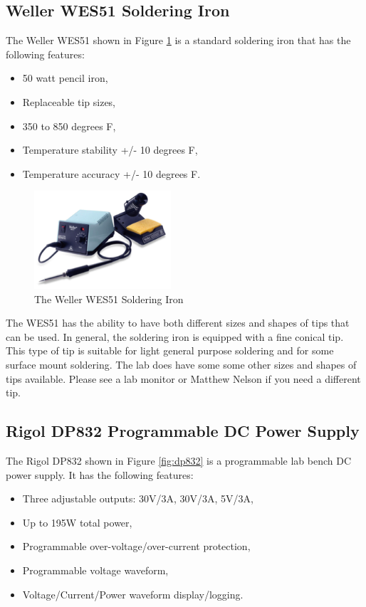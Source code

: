 \subsection{Weller WES51 Soldering Iron}
The Weller WES51 shown in Figure \ref{fig:wes51} is a standard soldering iron that has the following features:

\begin{itemize}
\item 50 watt pencil iron,
\item Replaceable tip sizes,
\item 350 to 850 degrees F,
\item Temperature stability +/- 10 degrees F,
\item Temperature accuracy +/- 10 degrees F.
\end{itemize}

\begin{figure}[ht]
\centering
\includegraphics[width=2in]{images/wes51.png}
\caption{The Weller WES51 Soldering Iron}
\label{fig:wes51}
\end{figure}

The WES51 has the ability to have both different sizes and shapes of tips that can be used.  In general, the soldering iron is equipped with a fine conical tip.  This type of tip is suitable for light general purpose soldering and for some surface mount soldering.  The lab does have some some other sizes and shapes of tips available.  Please see a lab monitor or Matthew Nelson if you need a different tip.

\subsection{Rigol DP832 Programmable DC Power Supply}

The Rigol DP832 shown in Figure \ref{fig:dp832} is a programmable lab bench DC power supply.  It has the following features:

\begin{itemize}
\item Three adjustable outputs: 30V/3A, 30V/3A, 5V/3A,
\item Up to 195W total power,
\item Programmable over-voltage/over-current protection,
\item Programmable voltage waveform,
\item Voltage/Current/Power waveform display/logging.
\end{itemize}

